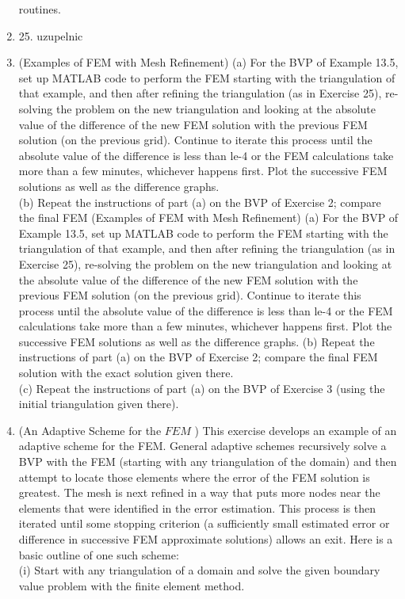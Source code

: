 \documentclass[../main.tex]{subfiles}
\begin{document}
\begin{enumerate}
routines. 
	\item 25. uzupelnic
	\item (Examples of FEM with Mesh Refinement) (a) For the BVP of Example 13.5, set up MATLAB code to perform the FEM starting with the triangulation of that example, and then after refining the triangulation (as in Exercise 25), re-solving the problem on the new triangulation and looking at the absolute value of the difference of the new FEM solution with the previous FEM solution (on the previous grid). Continue to iterate this process until the absolute value of the difference is less than le-4 or the FEM calculations take more than a few minutes, whichever happens first. Plot the successive FEM solutions as well as the difference graphs.\\
(b) Repeat the instructions of part (a) on the BVP of Exercise 2; compare the final FEM (Examples of FEM with Mesh Refinement) (a) For the BVP of Example 13.5, set up MATLAB code to perform the FEM starting with the triangulation of that example, and then after refining the triangulation (as in Exercise 25), re-solving the problem on the new triangulation and looking at the absolute value of the difference of the new FEM solution with the previous FEM solution (on the previous grid). Continue to iterate this process until the absolute value of the difference is less than le-4 or the FEM calculations take more than a few minutes, whichever happens first. Plot the successive FEM solutions as well as the difference graphs.
(b) Repeat the instructions of part (a) on the BVP of Exercise 2; compare the final FEM solution with the exact solution given there. \\
(c) Repeat the instructions of part (a) on the BVP of Exercise 3 (using the initial triangulation 
given there). 
	\item (An Adaptive Scheme for the $F E M$ ) This exercise develops an example of an adaptive scheme for the FEM. General adaptive schemes recursively solve a BVP with the FEM (starting with any triangulation of the domain) and then attempt to locate those elements where the error of the FEM solution is greatest. The mesh is next refined in a way that puts more nodes near the elements that were identified in the error estimation. This process is then iterated until some stopping criterion (a sufficiently small estimated error or difference in successive FEM approximate solutions) allows an exit. Here is a basic outline of one such scheme:\\
(i) Start with any triangulation of a domain and solve the given boundary value problem with the finite element method.\\

\end{enumerate}
\end{document}
